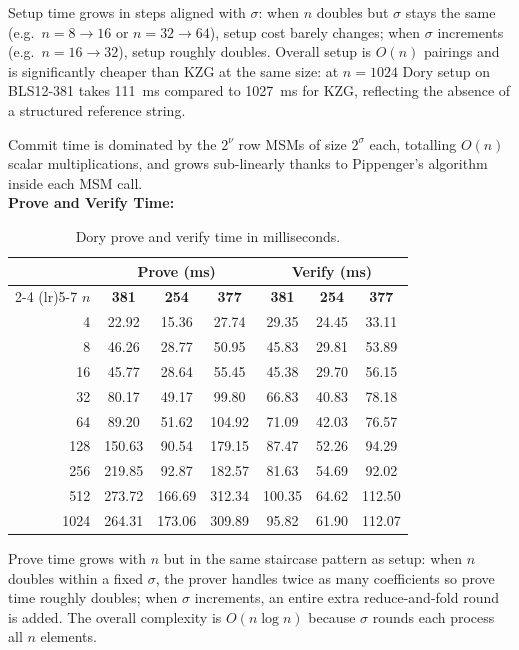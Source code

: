 Setup time grows in steps aligned with $\sigma$: when $n$ doubles but
$\sigma$ stays the same (e.g.\ $n = 8 \to 16$ or $n = 32 \to 64$), setup
cost barely changes; when $\sigma$ increments (e.g.\ $n = 16 \to 32$),
setup roughly doubles. Overall setup is $O(n)$ pairings and is significantly
cheaper than KZG at the same size: at $n = 1024$ Dory setup on BLS12-381
takes 111~ms compared to 1027~ms for KZG, reflecting the absence of a
structured reference string.

Commit time is dominated by the $2^\nu$ row MSMs of size $2^\sigma$ each,
totalling $O(n)$ scalar multiplications, and grows sub-linearly thanks to
Pippenger's algorithm inside each MSM call.
\\
\textbf{Prove and Verify Time:}

\begin{table}[H]
\centering
\caption{Dory prove and verify time in milliseconds.}
\label{tab:dory-prove-verify}
\begin{tabular}{rcccccc}
\toprule
& \multicolumn{3}{c}{\textbf{Prove (ms)}} & \multicolumn{3}{c}{\textbf{Verify (ms)}} \\
\cmidrule(lr){2-4} \cmidrule(lr){5-7}
$n$ & \textbf{381} & \textbf{254} & \textbf{377}
    & \textbf{381} & \textbf{254} & \textbf{377} \\
\midrule
4    & 22.92  & 15.36  & 27.74  & 29.35  & 24.45 & 33.11 \\
8    & 46.26  & 28.77  & 50.95  & 45.83  & 29.81 & 53.89 \\
16   & 45.77  & 28.64  & 55.45  & 45.38  & 29.70 & 56.15 \\
32   & 80.17  & 49.17  & 99.80  & 66.83  & 40.83 & 78.18 \\
64   & 89.20  & 51.62  & 104.92 & 71.09  & 42.03 & 76.57 \\
128  & 150.63 & 90.54  & 179.15 & 87.47  & 52.26 & 94.29 \\
256  & 219.85 & 92.87  & 182.57 & 81.63  & 54.69 & 92.02 \\
512  & 273.72 & 166.69 & 312.34 & 100.35 & 64.62 & 112.50 \\
1024 & 264.31 & 173.06 & 309.89 & 95.82  & 61.90 & 112.07 \\
\bottomrule
\end{tabular}
\end{table}

Prove time grows with $n$ but in the same staircase pattern as setup: when
$n$ doubles within a fixed $\sigma$, the prover handles twice as many
coefficients so prove time roughly doubles; when $\sigma$ increments, an
entire extra reduce-and-fold round is added. The overall complexity is
$O(n\log n)$ because $\sigma$ rounds each process all $n$ elements.

